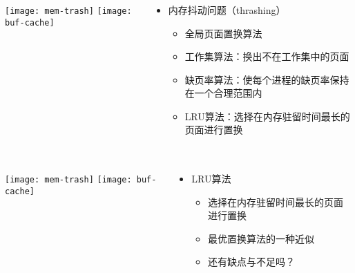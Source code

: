 \begin{frame}[plain]
	\frametitle{ }
	\begin{columns}
		\begin{column}{.4\textwidth}
			\centering
			\texttt{[image: mem-trash]}
			\texttt{[image: buf-cache]}
		\end{column}
		
		\begin{column}{.6\textwidth}
			
			\begin{itemize}\Large
				\item 内存抖动问题（thrashing）
				\begin{itemize}\large
					\item 全局页面置换算法
					\item 工作集算法：换出不在工作集中的页面
					\item 缺页率算法：使每个进程的缺页率保持在一个合理范围内
					\item LRU算法：选择在内存驻留时间最长的页面进行置换
				\end{itemize}
			\end{itemize}
			
		\end{column}
		
		
	\end{columns}
\end{frame}


\begin{frame}[plain]
	\frametitle{ }
	\begin{columns}
		\begin{column}{.4\textwidth}
			\centering
			\texttt{[image: mem-trash]}
			\texttt{[image: buf-cache]}
			
		\end{column}
		
		\begin{column}{.6\textwidth}
			
			\begin{itemize}\Large
				\item LRU算法
				\begin{itemize}\large

					\item 选择在内存驻留时间最长的页面进行置换
					\item 最优置换算法的一种近似
					\item 还有缺点与不足吗？
				\end{itemize}
			\end{itemize}
			
		\end{column}
		
		
	\end{columns}
\end{frame}



